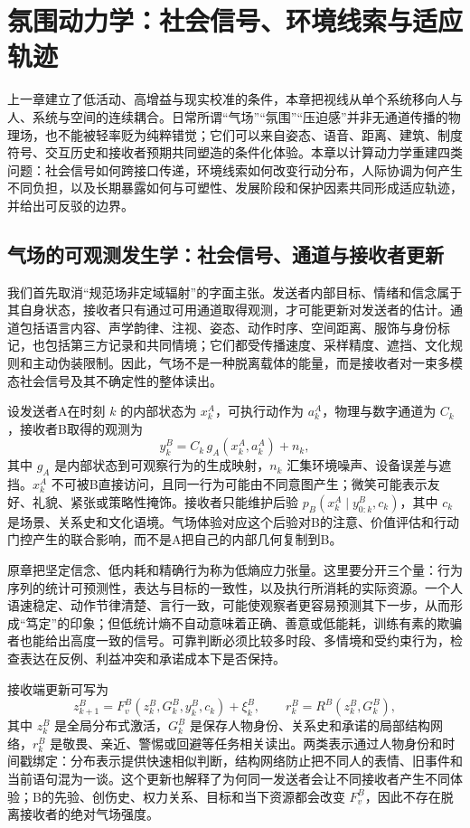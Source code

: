 \chapter{氛围动力学：社会信号、环境线索与适应轨迹}
\label{chp:atmosphere_geometric_dynamics}
上一章建立了低活动、高增益与现实校准的条件，本章把视线从单个系统移向人与人、系统与空间的连续耦合。日常所谓“气场”“氛围”“压迫感”并非无通道传播的物理场，也不能被轻率贬为纯粹错觉；它们可以来自姿态、语音、距离、建筑、制度符号、交互历史和接收者预期共同塑造的条件化体验。本章以计算动力学重建四类问题：社会信号如何跨接口传递，环境线索如何改变行动分布，人际协调为何产生不同负担，以及长期暴露如何与可塑性、发展阶段和保护因素共同形成适应轨迹，并给出可反驳的边界。

\section{气场的可观测发生学：社会信号、通道与接收者更新}
\label{sec:physics_of_aura}
我们首先取消“规范场非定域辐射”的字面主张。发送者内部目标、情绪和信念属于其自身状态，接收者只有通过可用通道取得观测，才可能更新对发送者的估计。通道包括语言内容、声学韵律、注视、姿态、动作时序、空间距离、服饰与身份标记，也包括第三方记录和共同情境；它们都受传播速度、采样精度、遮挡、文化规则和主动伪装限制。因此，气场不是一种脱离载体的能量，而是接收者对一束多模态社会信号及其不确定性的整体读出。

设发送者A在时刻 $k$ 的内部状态为 $x_k^A$，可执行动作为 $a_k^A$，物理与数字通道为 $C_k$，接收者B取得的观测为
\[
y_k^B=C_k\,g_A(x_k^A,a_k^A)+n_k,
\]
其中 $g_A$ 是内部状态到可观察行为的生成映射，$n_k$ 汇集环境噪声、设备误差与遮挡。$x_k^A$ 不可被B直接访问，且同一行为可能由不同意图产生；微笑可能表示友好、礼貌、紧张或策略性掩饰。接收者只能维护后验 $p_B(x_k^A\mid y_{0:k}^B,c_k)$，其中 $c_k$ 是场景、关系史和文化语境。气场体验对应这个后验对B的注意、价值评估和行动门控产生的联合影响，而不是A把自己的内部几何复制到B。

原章把坚定信念、低内耗和精确行为称为低熵应力张量。这里要分开三个量：行为序列的统计可预测性，表达与目标的一致性，以及执行所消耗的实际资源。一个人语速稳定、动作节律清楚、言行一致，可能使观察者更容易预测其下一步，从而形成“笃定”的印象；但低统计熵不自动意味着正确、善意或低能耗，训练有素的欺骗者也能给出高度一致的信号。可靠判断必须比较多时段、多情境和受约束行为，检查表达在反例、利益冲突和承诺成本下是否保持。

接收端更新可写为
\[
z_{k+1}^B=F_v^B(z_k^B,G_k^B,y_k^B,c_k)+\xi_k^B,
\qquad r_k^B=R^B(z_k^B,G_k^B),
\]
其中 $z_k^B$ 是全局分布式激活，$G_k^B$ 是保存人物身份、关系史和承诺的局部结构网络，$r_k^B$ 是敬畏、亲近、警惕或回避等任务相关读出。两类表示通过人物身份和时间戳绑定：分布表示提供快速相似判断，结构网络防止把不同人的表情、旧事件和当前语句混为一谈。这个更新也解释了为何同一发送者会让不同接收者产生不同体验；B的先验、创伤史、权力关系、目标和当下资源都会改变 $F_v^B$，因此不存在脱离接收者的绝对气场强度。

